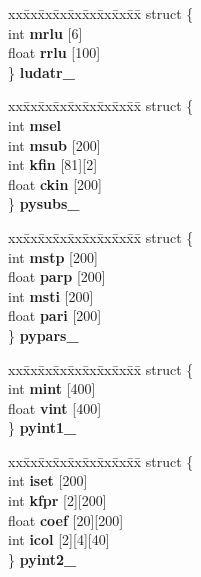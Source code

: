 \begin{CompactItemize}
\begin{tabbing}
\end{tabbing}\item 
\begin{tabbing}
xx\=xx\=xx\=xx\=xx\=xx\=xx\=xx\=xx\=\kill
struct \{\\
\>int {\bf mrlu} [6]\\
\>float {\bf rrlu} [100]\\
\} {\bf ludatr\_}\\

\end{tabbing}\item 
\begin{tabbing}
xx\=xx\=xx\=xx\=xx\=xx\=xx\=xx\=xx\=\kill
struct \{\\
\>int {\bf msel}\\
\>int {\bf msub} [200]\\
\>int {\bf kfin} [81][2]\\
\>float {\bf ckin} [200]\\
\} {\bf pysubs\_}\\

\end{tabbing}\item 
\begin{tabbing}
xx\=xx\=xx\=xx\=xx\=xx\=xx\=xx\=xx\=\kill
struct \{\\
\>int {\bf mstp} [200]\\
\>float {\bf parp} [200]\\
\>int {\bf msti} [200]\\
\>float {\bf pari} [200]\\
\} {\bf pypars\_}\\

\end{tabbing}\item 
\begin{tabbing}
xx\=xx\=xx\=xx\=xx\=xx\=xx\=xx\=xx\=\kill
struct \{\\
\>int {\bf mint} [400]\\
\>float {\bf vint} [400]\\
\} {\bf pyint1\_}\\

\end{tabbing}\item 
\begin{tabbing}
xx\=xx\=xx\=xx\=xx\=xx\=xx\=xx\=xx\=\kill
struct \{\\
\>int {\bf iset} [200]\\
\>int {\bf kfpr} [2][200]\\
\>float {\bf coef} [20][200]\\
\>int {\bf icol} [2][4][40]\\
\} {\bf pyint2\_}\\


\end{tabbing}
\end{CompactItemize}

